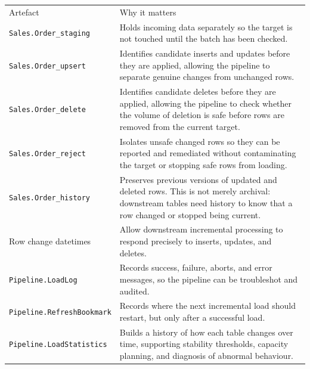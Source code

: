 \documentclass[10pt,openany,10pt]{book}
\newcounter{none}
\let\podeToprule\toprule
\let\podeMidrule\midrule
\let\podeBottomrule\bottomrule
\renewcommand{\toprule}{\arrayrulecolor{pbiGrid}\podeToprule}
\renewcommand{\midrule}{\arrayrulecolor{pbiGrid}\podeMidrule}
\renewcommand{\bottomrule}{\arrayrulecolor{pbiGrid}\podeBottomrule}
\begin{document}
{\def\LTcaptype{none} %
\begin{longtable}[]{@{}
  >{\raggedright\arraybackslash}p{}
  >{\raggedright\arraybackslash}p{}@{}}
\toprule\noalign{}
\begin{minipage}[b]{\linewidth}\raggedright
Artefact
\end{minipage} & \begin{minipage}[b]{\linewidth}\raggedright
Why it matters
\end{minipage} \\
\midrule\noalign{}
\endhead
\bottomrule\noalign{}
\endlastfoot
\texttt{Sales.Order\_staging} & Holds incoming data separately so the
target is not touched until the batch has been checked. \\
\texttt{Sales.Order\_upsert} & Identifies candidate inserts and updates
before they are applied, allowing the pipeline to separate genuine
changes from unchanged rows. \\
\texttt{Sales.Order\_delete} & Identifies candidate deletes before they
are applied, allowing the pipeline to check whether the volume of
deletion is safe before rows are removed from the current target. \\
\texttt{Sales.Order\_reject} & Isolates unsafe changed rows so they can
be reported and remediated without contaminating the target or stopping
safe rows from loading. \\
\texttt{Sales.Order\_history} & Preserves previous versions of updated
and deleted rows. This is not merely archival: downstream tables need
history to know that a row changed or stopped being current. \\
Row change datetimes & Allow downstream incremental processing to
respond precisely to inserts, updates, and deletes. \\
\texttt{Pipeline.LoadLog} & Records success, failure, aborts, and error
messages, so the pipeline can be troubleshot and audited. \\
\texttt{Pipeline.RefreshBookmark} & Records where the next incremental
load should restart, but only after a successful load. \\
\texttt{Pipeline.LoadStatistics} & Builds a history of how each table
changes over time, supporting stability thresholds, capacity planning,
and diagnosis of abnormal behaviour. \\
\end{longtable}
}
\end{document}
